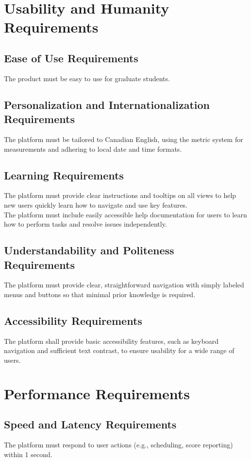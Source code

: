 \documentclass[12pt]{article}
\begin{document}
\section{Usability and Humanity Requirements}
\subsection{Ease of Use Requirements}
The product must be easy to use for graduate students.

\subsection{Personalization and Internationalization Requirements}
The platform must be tailored to Canadian English, using the metric system for measurements and adhering to local date and time formats.

\subsection{Learning Requirements}
The platform must provide clear instructions and tooltips on all views to help new users quickly learn how to navigate and use key features.\\

\noindent The platform must include easily accessible help documentation for users to learn how to perform tasks and resolve issues independently.


\subsection{Understandability and Politeness Requirements}
The platform must provide clear, straightforward navigation with simply labeled menus and buttons so that minimal prior knowledge is required.

\subsection{Accessibility Requirements}
The platform shall provide basic accessibility features, such as keyboard navigation and sufficient text contrast, to ensure usability for a wide range of users.

\section{Performance Requirements}
\subsection{Speed and Latency Requirements}
The platform must respond to user actions (e.g., scheduling, score reporting) within 1 second.
\end{document}
